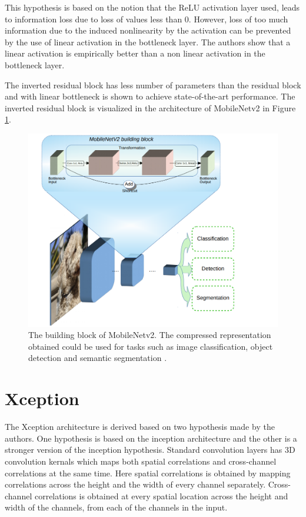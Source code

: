 This hypothesis is based on the notion that the ReLU activation layer used, leads to information loss due to loss of values less than 0. However, loss of too much information due to the induced nonlinearity by the activation can be prevented by the use of linear activation in the bottleneck layer. The authors show that a linear activation is empirically better than a non linear activation in the bottleneck layer.

The inverted residual block has less number of parameters than the residual block and with linear bottleneck is shown to achieve state-of-the-art performance. The inverted residual block is visualized in the architecture of MobileNetv2 in Figure \ref{Fig:mobileNetv2bb}.

	\begin{figure}
		\centering
		\includegraphics[width=.7\linewidth]{images/mobileNetv2_bb}
		\caption{The building block of MobileNetv2. The compressed representation obtained could be used for tasks such as image classification, object detection and semantic segmentation \cite{mnbb}.}
		\label{Fig:mobileNetv2bb}
	\end{figure}

\section{Xception}
\label{section:xcep}

The Xception architecture is derived based on two hypothesis made by the authors. One hypothesis is based on the inception architecture and the other is a stronger version of the inception hypothesis. Standard convolution layers has 3D convolution kernals which maps both spatial correlations and cross-channel correlations at the same time. Here spatial correlations is obtained by mapping correlations across the height and the width of every channel separately. Cross-channel correlations is obtained at every spatial location across the height and width of the channels, from each of the channels in the input. 

